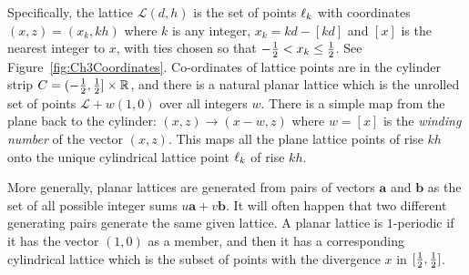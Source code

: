 
\newcommand{\dk}{x_k}\newcommand{\dm}{x_m}\newcommand{\dn}{x_n}\newcommand{\dmn}{x_{m+n}}
Specifically, the lattice  $\mathcal{L}(d,h)$ is the set of points  $\ell_{{k}}$ with coordinates  $(x,z)=(\dk,kh)$ where $k$
is any integer, $\dk=kd-[kd]$ and $[x]$ is the nearest integer to $x$, with ties chosen so that $-\jhalf < \dk \leq \jhalf$.%
See Figure~\ref{fig:Ch3Coordinates}. 
Co-ordinates of lattice points are in the cylinder strip $C=(-\textstyle{\frac{1}{2}},\textstyle{\frac{1}{2}}]\times\mathbb{R}$, and there is a natural 
{planar lattice}  which is the unrolled set of points $\mathcal{L}+w (1,0)$ over all integers $w$. 
There is a simple map from the plane back to the cylinder: $(x,z)\rightarrow(x-w,z)$ where $w=[x]$ is the \emph{winding number} of the vector $(x,z)$. This maps all the plane lattice points of rise $kh$ onto the unique cylindrical lattice point $\ell_{{k}}$ of rise $kh$. 

More generally, planar lattices are generated from pairs of vectors $\mathbf{a}$ and $\mathbf{b}$ as the set of all possible integer sums  $u \mathbf{a}+ v\mathbf{b}$. It will often happen that two different generating pairs generate the same given lattice. A planar lattice is $1$-periodic if it has the vector $(1,0)$ as a member, and then it has a corresponding cylindrical lattice which is the subset of points with the divergence $x$ in $[\textstyle{\frac{1}{2}},\textstyle{\frac{1}{2}}]$.  

